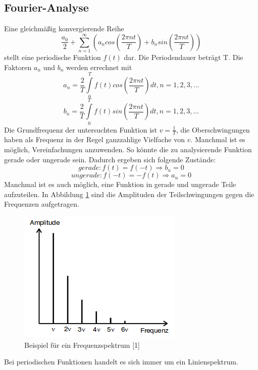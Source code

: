 \documentclass[11pt,ngerman,a4paper]{article}
\begin{document}
\subsection{Fourier-Analyse}
Eine gleichmäßig konvergierende Reihe
\begin{equation}
\frac{a_0}{2}+\sum_{n=1}^\infty \left(a_ncos\left(\frac{2\pi nt}{T}\right)+b_nsin\left(\frac{2\pi nt}{T}\right)\right)
\label{formel1}
\end{equation}
stellt eine periodische Funktion $f(t)$ dar. Die Periodendauer beträgt T. Die Faktoren $a_n$ und $b_n$ werden errechnet mit
\begin{equation}
a_n=\frac{2}{T}\int\limits_{0}^{T}f(t)cos\left(\frac{2\pi nt}{T}\right)dt , n = 1,2,3,...
\label{an}
\end{equation}
\begin{equation}
b_n=\frac{2}{T}\int\limits_{0}^{T}f(t)sin\left(\frac{2\pi nt}{T}\right)dt , n = 1,2,3,...
\label{bn}
\end{equation}
Die Grundfrequenz der untersuchten Funktion ist $v=\frac{1}{T}$, die Oberschwingungen haben als Frequenz in der Regel ganzzahlige Vielfache von $v$.
Manchmal ist es möglich, Vereinfachungen anzuwenden. So könnte die zu analysierende Funktion gerade oder ungerade sein. Dadurch ergeben sich folgende Zustände:
\begin{equation}
gerade: f(t)=f(-t) \Rightarrow b_n=0
\end{equation}
\begin{equation}
ungerade: f(-t)=-f(t) \Rightarrow a_n=0
\end{equation}
Manchmal ist es auch möglich, eine Funktion in gerade und ungerade Teile aufzuteilen. In Abbildung \ref{spektrumtheo} sind die Amplituden der Teilschwingungen gegen die Frequenzen aufgetragen.
\begin{figure}[htp]
\centering
\includegraphics[scale=0.7]{abb/spektrumtheo.png}
\caption{Beispiel für ein Frequenzspektrum [1]}
\label{spektrumtheo}
\end{figure}
Bei periodischen Funktionen handelt es sich immer um ein Linienspektrum.
\end{document}
